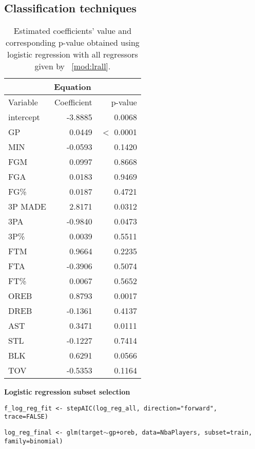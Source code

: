 \subsection*{Classification techniques}\label{appendix:ct}

\begin{center}
\end{center}

\begin{table}[H]
	\centering
	\begin{tabular}{|| l | r | r ||} 
		\hline
		\multicolumn{3}{|c|}{Equation} \\
		\hline
		Variable & Coefficient & p-value \\
		\hline
		intercept & -3.8885 & 0.0068 \\
		GP & 0.0449 & $<$ 0.0001 \\
		MIN & -0.0593 & 0.1420 \\
		FGM & 0.0997 & 0.8668 \\
		FGA & 0.0183 & 0.9469 \\
		FG\% & 0.0187 & 0.4721 \\
		3P MADE & 2.8171 & 0.0312 \\
		3PA & -0.9840 & 0.0473 \\
		3P\% & 0.0039 & 0.5511 \\
		FTM & 0.9664 & 0.2235 \\
		FTA & -0.3906 & 0.5074 \\
		FT\% & 0.0067 & 0.5652 \\
		OREB & 0.8793 & 0.0017 \\
		DREB & -0.1361 & 0.4137 \\
		AST & 0.3471 & 0.0111 \\
		STL & -0.1227 & 0.7414 \\
		BLK & 0.6291 & 0.0566 \\				
		TOV & -0.5353 & 0.1164 \\		
		\hline
	\end{tabular}
	\caption{Estimated coefficients' value and corresponding p-value obtained using logistic regression with all regressors given by \Mod~\ref{mod:lrall}.}
	\label{table:LRAllSum}
\end{table}

\noindent
\textbf{Logistic regression subset selection}

\begin{center}

\texttt{f\_log\_reg\_fit <- stepAIC(log\_reg\_all, direction="forward", trace=FALSE)}	

\texttt{log\_reg\_final <- glm(target$\sim$gp+oreb, data=NbaPlayers, subset=train, family=binomial)}	


\end{center}

